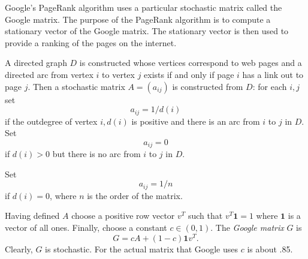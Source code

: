 \documentclass[12pt]{article}
\begin{document}
Google's PageRank algorithm uses a particular stochastic matrix called the Google matrix. 
The purpose of the PageRank algorithm is to compute a stationary vector of the Google matrix.
The stationary vector is then used to provide a ranking of the pages on the internet.

A directed graph $D$ is constructed whose vertices correspond to web pages and a directed
arc from vertex $i$ to vertex $j$ exists if and only if page $i$ has a link out to 
page $j$. 
Then a stochastic matrix $A=(a_{ij})$ is constructed from $D$: for each $i,j$
set 
$$
a_{ij} = 1/d(i)
$$ 
if the outdegree of vertex $i, d(i)$ is positive and there is an arc from $i$ to $j$ in $D$.
Set 
$$
a_{ij} = 0
$$ 
if $d(i) >0$  but there is no arc from $i$ to $j$ in $D$.

Set
$$
a_{ij} = 1/n
$$ 
if $d(i) = 0$, where $n$ is the order of the matrix. 

Having defined $A$ choose a positive row vector $v^T$ such that $v^T\textbf{1} = 1$
where $\textbf{1}$ is a vector of all ones.
Finally, choose a constant $c \in (0,1)$.
The \emph{Google matrix} $G$
is
$$
G = cA + (1-c)\textbf{1}v^T .
$$
Clearly, $G$ is stochastic. For the actual matrix that Google uses $c$ is about .85.

\end{document}
